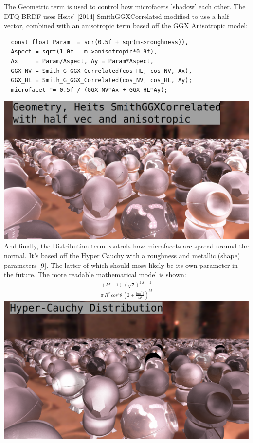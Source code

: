 \documentclass{article}
\begin{document}
  The Geometric term is used to control how microfacets 'shadow' each other. The
DTQ BRDF uses Heits' [2014] SmithGGXCorrelated modified to use a half vector,
combined with an anisotropic term based off the GGX Anisotropic model:
  \begin{lstlisting}
  const float Param  = sqr(0.5f + sqr(m->roughness)),
  Aspect = sqrt(1.0f - m->anisotropic*0.9f),
  Ax     = Param/Aspect, Ay = Param*Aspect,
  GGX_NV = Smith_G_GGX_Correlated(cos_HL, cos_NV, Ax),
  GGX_HL = Smith_G_GGX_Correlated(cos_NV, cos_HL, Ay);
  microfacet *= 0.5f / (GGX_NV*Ax + GGX_HL*Ay);
  \end{lstlisting}
  \includegraphics[scale=0.20]{geometric}
  And finally, the Distribution term controls how microfacets are spread around
the normal. It's based off the Hyper Cauchy with a roughness and metallic
(shape) parameters [9]. The latter of which should most likely be its own
parameter in the future. The more readable mathematical model is shown:
  \begin{align}
  \frac{(M - 1)\:(\sqrt{2})^{2\:S\:-\:2}}
  	    {\pi\:R^{2}\:cos^{4}\theta\:(2 +
  	      \frac{tan^{2}\theta}{M^2})^M}
  \end{align}
  \includegraphics[scale=0.20]{distribution}
  
\end{document}
